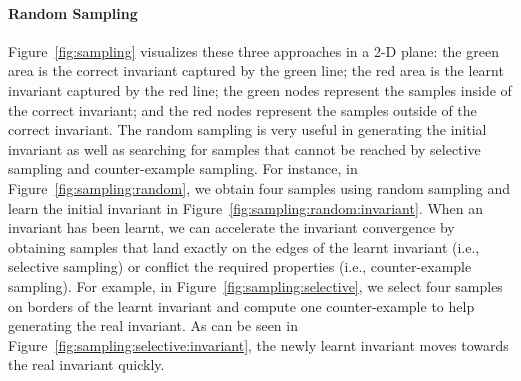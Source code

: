\paragraph{Random Sampling} 
Figure~\ref{fig:sampling} visualizes these three approaches in a 2-D plane:
the green area is the correct invariant captured by the green line;
the red area is the learnt invariant captured by the red line;
the green nodes represent the samples inside of the correct invariant;
and the red nodes represent the samples outside of the correct invariant.
The random sampling is very useful in generating the initial invariant
as well as searching for samples that cannot be reached
by selective sampling and counter-example sampling.
For instance, in Figure~\ref{fig:sampling:random},
we obtain four samples using random sampling
and learn the initial invariant in Figure~\ref{fig:sampling:random:invariant}.
When an invariant has been learnt,
we can accelerate the invariant convergence by obtaining samples that
land exactly on the edges of the learnt invariant (i.e., selective sampling)
or conflict the required properties (i.e., counter-example sampling).
For example, in Figure~\ref{fig:sampling:selective},
we select four samples on borders of the learnt invariant and
compute one counter-example to help generating the real invariant.
As can be seen in Figure~\ref{fig:sampling:selective:invariant},
the newly learnt invariant moves towards the real invariant quickly.

